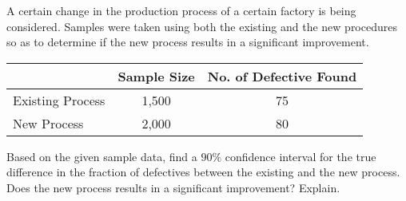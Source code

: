 \documentclass[letterpaper,10pt,addpoints]{exam}
\begin{document}
\begin{questions}


\question[15]
A certain change in the production process of a certain factory is being considered. Samples were taken using both the existing and the new procedures so as to determine if the new process results in a significant improvement.

\begin{tabular}{|l|c|c|}
\hline & Sample Size & No. of Defective Found \\
\hline Existing Process & 1,500 & 75 \\
\hline New Process & 2,000 & 80 \\
\hline
\end{tabular}

Based on the given sample data, find a $90 \%$ confidence interval for the true difference in the fraction of defectives between the existing and the new process. Does the new process results in a significant improvement? Explain.





\end{questions}
\end{document}
